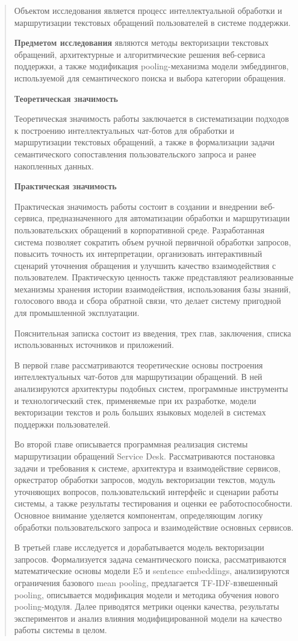 \documentclass[
]{article}
\begin{document}
\begin{quote}
Объектом исследования является процесс интеллектуальной обработки и
маршрутизации текстовых обращений пользователей в системе поддержки.

\textbf{Предметом исследования} являются методы векторизации текстовых
обращений, архитектурные и алгоритмические решения веб-сервиса
поддержки, а также модификация pooling-механизма модели эмбеддингов,
используемой для семантического поиска и выбора категории обращения.

\textbf{Теоретическая значимость}

Теоретическая значимость работы заключается в систематизации подходов к
построению интеллектуальных чат-ботов для обработки и маршрутизации
текстовых обращений, а также в формализации задачи семантического
сопоставления пользовательского запроса и ранее накопленных данных.

\textbf{Практическая значимость}

Практическая значимость работы состоит в создании и внедрении
веб-сервиса, предназначенного для автоматизации обработки и
маршрутизации пользовательских обращений в корпоративной среде.
Разработанная система позволяет сократить объем ручной первичной
обработки запросов, повысить точность их интерпретации, организовать
интерактивный сценарий уточнения обращения и улучшить качество
взаимодействия с пользователем. Практическую ценность также представляют
реализованные механизмы хранения истории взаимодействия, использования
базы знаний, голосового ввода и сбора обратной связи, что делает систему
пригодной для промышленной эксплуатации.

Пояснительная записка состоит из введения, трех глав, заключения, списка
использованных источников и приложений.

В первой главе рассматриваются теоретические основы построения
интеллектуальных чат-ботов для маршрутизации обращений. В ней
анализируются архитектуры подобных систем, программные инструменты и
технологический стек, применяемые при их разработке, модели векторизации
текстов и роль больших языковых моделей в системах поддержки
пользователей.

Во второй главе описывается программная реализация системы маршрутизации
обращений Service Desk. Рассматриваются постановка задачи и требования к
системе, архитектура и взаимодействие сервисов, оркестратор обработки
запросов, модуль векторизации текстов, модуль уточняющих вопросов,
пользовательский интерфейс и сценарии работы системы, а также результаты
тестирования и оценки ее работоспособности. Основное внимание уделяется
компонентам, определяющим логику обработки пользовательского запроса и
взаимодействие основных сервисов.

В третьей главе исследуется и дорабатывается модель векторизации
запросов. Формализуется задача семантического поиска, рассматриваются
математические основы модели E5 и sentence embeddings, анализируются
ограничения базового mean pooling, предлагается TF-IDF-взвешенный
pooling, описывается модификация модели и методика обучения нового
pooling-модуля. Далее приводятся метрики оценки качества, результаты
экспериментов и анализ влияния модифицированной модели на качество
работы системы в целом.
\end{quote}
\end{document}
